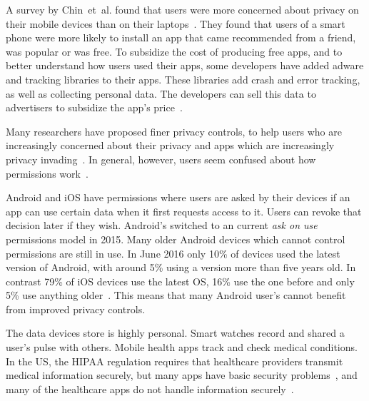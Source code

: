 \documentclass[thesis.tex]{subfiles}
\begin{document}
A survey by Chin~et~al{.} found that users were more concerned about
privacy on their mobile devices than on their
laptops~\cite{chin_measuring_2012}. They found that users of a smart phone were
more likely to install an app that came recommended from a friend, was popular
or was free. To subsidize the cost of producing free apps, and to better
understand how users used their apps, some developers have added adware and
tracking libraries to their apps. These libraries add
crash and error tracking, as well as collecting personal data. The developers can sell this data to
advertisers to subsidize the app's price~\cite{seungyeop_han_study_2012}.

Many researchers have proposed finer privacy controls, to help users who are increasingly concerned about their
privacy and apps which are increasingly privacy invading~\cite{jeon_dr._2012,beresford_mockdroid:_2011,conti_crepe:_2010,backes_appguard_2013}.  
In general, however, users seem confused about how permissions work~\cite{felt_android_2012}. 

Android and iOS have permissions where users are asked by their
devices if an app can use certain data when it first requests access to it.
Users can revoke that decision later if they wish.
Android's switched to an current \emph{ask on use} permissions model in 2015. 
Many older Android devices which cannot control permissions are
still in use. In June 2016 only 10\% of devices used the latest version of
Android, with around 5\% using a version more than five years old. In contrast 79\% of iOS devices use the latest
OS, 16\% use the one before and only 5\% use anything
older~\cite{apple_app_2017}. This means that many Android user's cannot benefit
from improved privacy controls.


The data devices store is highly personal. Smart watches
record and shared a user's pulse with others. Mobile health apps track and
check medical conditions. In the US, the \ac{HIPAA} regulation requires that
healthcare providers transmit medical information securely, but many apps have
basic security problems~\cite{fahl_why_2012}, and many of the healthcare apps
do not handle information securely~\cite{knorr_privacy_2015}.
\end{document}
